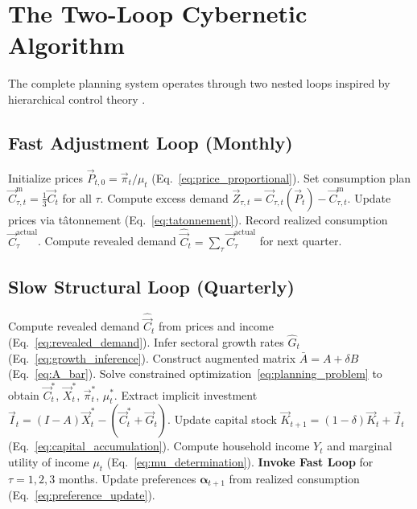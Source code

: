 \section{The Two-Loop Cybernetic Algorithm}
\label{sec:algorithm}
The complete planning system operates through two nested loops inspired
by hierarchical control theory \citep{mesarovic1970theory}.
\subsection{Fast Adjustment Loop (Monthly)}
\begin{algorithm}[H]
\caption{Monthly Price Adjustment Loop}
\label{alg:fast}
\begin{algorithmic}[1]
\STATE Initialize prices $\vec{P}_{t,0} = \vec{\pi}_t / \mu_t$
       (Eq.~\ref{eq:price_proportional}).
\STATE Set consumption plan $\vec{C}^{\mathrm{m}}_{\tau,t} =
       \tfrac{1}{3}\vec{C}_t$ for all $\tau$.
    \STATE Compute excess demand
           $\vec{Z}_{\tau,t} = \vec{C}_{\tau,t}(\vec{P}_t)
           - \vec{C}^{\mathrm{m}}_{\tau,t}$.
    \STATE Update prices via t\^{a}tonnement
           (Eq.~\ref{eq:tatonnement}).
    \STATE Record realized consumption $\vec{C}^{\mathrm{actual}}_\tau$.
\ENDFOR
\STATE Compute revealed demand
       $\hat{\vec{C}}_t = \sum_{\tau} \vec{C}^{\mathrm{actual}}_\tau$
       for next quarter.
\end{algorithmic}
\end{algorithm}
\subsection{Slow Structural Loop (Quarterly)}
\begin{algorithm}
\caption{Quarterly Planning Loop}
\label{alg:slow}
\begin{algorithmic}[1]
\STATE Compute revealed demand $\hat{\vec{C}}_t$ from prices and income
       (Eq.~\ref{eq:revealed_demand}).
\STATE Infer sectoral growth rates $\hat{G}_t$
       (Eq.~\ref{eq:growth_inference}).
\STATE Construct augmented matrix $\bar{A} = A + \delta B$
       (Eq.~\ref{eq:A_bar}).
\STATE Solve constrained optimization~\eqref{eq:planning_problem}
       to obtain $\vec{C}_t^*$, $\vec{X}_t^*$, $\vec{\pi}_t^*$, $\mu_t^*$.
\STATE Extract implicit investment
       $\vec{I}_t = (I - A)\vec{X}_t^* - (\vec{C}_t^* + \vec{G}_t )$.
\STATE Update capital stock
       $\vec{K}_{t+1} = (1-\delta)\vec{K}_t + \vec{I}_t$
       (Eq.~\ref{eq:capital_accumulation}).
\STATE Compute household income $Y_t$ and marginal utility of income $\mu_t$
       (Eq.~\ref{eq:mu_determination}).
\STATE \textbf{Invoke Fast Loop} for $\tau = 1,2,3$ months.
\STATE Update preferences $\boldsymbol{\alpha}_{t+1}$ from realized
       consumption (Eq.~\ref{eq:preference_update}).
\end{algorithmic}
\end{algorithm}
